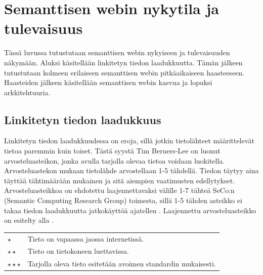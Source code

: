 \documentclass[finnish, 12pt, a4paper, elec, utf8, pdfa, online]{aaltothesis}
\begin{document}
{\section{Semanttisen webin nykytila ja tulevaisuus}
Tässä luvussa tutustutaan semanttisen webin nykyiseen ja tulevaisuuden näkymään. Aluksi käsitellään linkitetyn tiedon laadukkuutta. Tämän jälkeen tutustutaan kolmeen erilaiseen semanttisen webin pitkäaikaiseen haasteeseen. Haasteiden jälkeen käsitellään semanttisen webin kasvua ja lopuksi arkkitehtuuria.

\subsection{Linkitetyn tiedon laadukkuus}
\enlargethispage{1\baselineskip}
Linkitetyn tiedon laadukkuudessa on eroja, sillä jotkin tietolähteet määrittelevät tietoa paremmin kuin toiset. Tästä syystä Tim Berners-Lee on luonut arvosteluasteikon, jonka avulla tarjolla olevaa tietoa voidaan luokitella. Arvosteluastekon mukaan tietolähde arvostellaan 1-5 tähdellä. Tiedon täytyy aina täyttää tähtimäärään mukainen ja sitä aiempien vaatimusten edellytykset. Arvosteluasteikkoa on ehdotettu laajennettavaksi välille 1-7 tähteä SeCo:n (Semantic Computing Research Group) toimesta, sillä 1-5 tähden asteikko ei takaa tiedon laadukkuutta jatkokäyttöä ajatellen \cite{SeCo_stars}. Laajennettu arvosteluasteikko on esitelty alla \cite{SeCo_stars} \cite{SeCo_stars2} \cite{Tim-BL}.

\begin{tabular}{ll}
\vspace*{0.2cm}
$\star$                     & Tieto on vapaassa jaossa internetissä. \\
\vspace*{0.2cm}
$\star \star$                & Tieto on tietokoneen luettavissa. \\
\vspace*{0.2cm}
$\star\star\star$           & Tarjolla oleva tieto esitetään avoimen standardin mukaisesti. \\


\end{tabular}}
\end{document}

